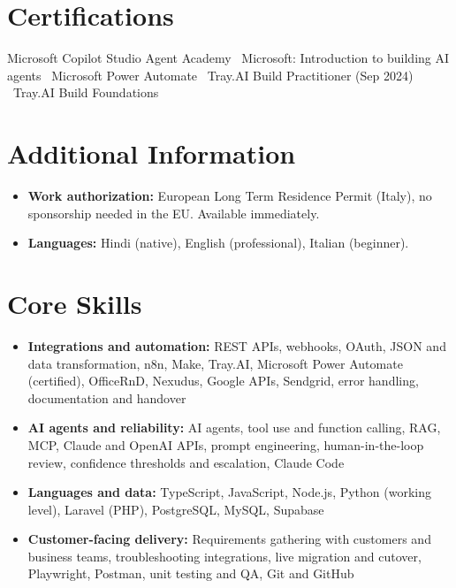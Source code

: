 \documentclass[a4paper,11pt]{article}
\begin{document}
\section{Certifications}
Microsoft Copilot Studio Agent Academy \textbullet\ Microsoft: Introduction to building AI agents \textbullet\ Microsoft Power Automate \textbullet\ Tray.AI Build Practitioner (Sep 2024) \textbullet\ Tray.AI Build Foundations

\section{Additional Information}
\begin{itemize}
 \item \textbf{Work authorization:} European Long Term Residence Permit (Italy), no sponsorship needed in the EU. Available immediately.
 \item \textbf{Languages:} Hindi (native), English (professional), Italian (beginner).
\end{itemize}

\section{Core Skills}
\begin{itemize}
 \item \textbf{Integrations and automation:} REST APIs, webhooks, OAuth, JSON and data transformation, n8n, Make, Tray.AI, Microsoft Power Automate (certified), OfficeRnD, Nexudus, Google APIs, Sendgrid, error handling, documentation and handover
 \item \textbf{AI agents and reliability:} AI agents, tool use and function calling, RAG, MCP, Claude and OpenAI APIs, prompt engineering, human-in-the-loop review, confidence thresholds and escalation, Claude Code
 \item \textbf{Languages and data:} TypeScript, JavaScript, Node.js, Python (working level), Laravel (PHP), PostgreSQL, MySQL, Supabase
 \item \textbf{Customer-facing delivery:} Requirements gathering with customers and business teams, troubleshooting integrations, live migration and cutover, Playwright, Postman, unit testing and QA, Git and GitHub
\end{itemize}
\end{document}
